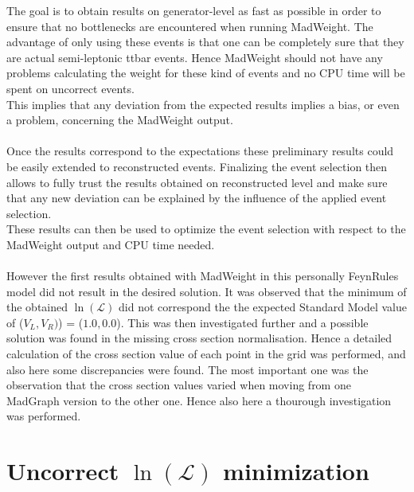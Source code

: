 
The goal is to obtain results on generator-level as fast as possible in order to ensure that no bottlenecks are encountered when running MadWeight.
The advantage of only using these events is that one can be completely sure that they are actual semi-leptonic ttbar events. Hence MadWeight should not have any problems calculating the weight for these kind of events and no CPU time will be spent on uncorrect events.\\
This implies that any deviation from the expected results implies a bias, or even a problem, concerning the MadWeight output.\\
\\
Once the results correspond to the expectations these preliminary results could be easily extended to reconstructed events. Finalizing the event selection then allows to fully trust the results obtained on reconstructed level and make sure that any new deviation can be explained by the influence of the applied event selection.\\
These results can then be used to optimize the event selection with respect to the MadWeight output and CPU time needed.\\
\\
However the first results obtained with MadWeight in this personally FeynRules model did not result in the desired solution. It was observed that the minimum of the obtained $\ln(\mathcal{L})$ did not correspond the the expected Standard Model value of ($V_{L}, V_R)$) = ($1.0, 0.0$). This was then investigated further and a possible solution was found in the missing cross section normalisation. Hence a detailed calculation of the cross section value of each point in the grid was performed, and also here some discrepancies were found. The most important one was the observation that the cross section values varied when moving from one MadGraph version to the other one. Hence also here a thourough investigation was performed.

\section{Uncorrect $\ln(\mathcal{L})$ minimization}

